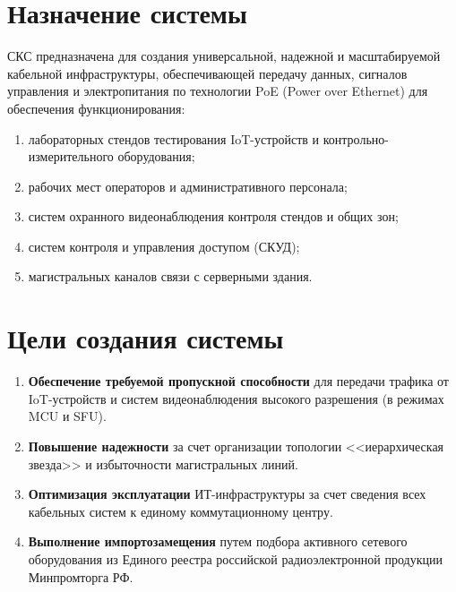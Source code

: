 \documentclass[a4paper,oneside,14pt]{extreport}
\begin{document}
\begin{appendices}

\section{Назначение системы}
СКС предназначена для создания универсальной, надежной и масштабируемой кабельной инфраструктуры, обеспечивающей передачу данных, сигналов управления и электропитания по технологии PoE (Power over Ethernet) для обеспечения функционирования:
\begin{enumerate}[label=\asbuk*)]
    \item лабораторных стендов тестирования IoT-устройств и контрольно-измерительного оборудования;
    \item рабочих мест операторов и административного персонала;
    \item систем охранного видеонаблюдения контроля стендов и общих зон;
    \item систем контроля и управления доступом (СКУД);
    \item магистральных каналов связи с серверными здания.
\end{enumerate}

\section{Цели создания системы}
\begin{enumerate}[label=\arabic{section}.\arabic*]
    \item \textbf{Обеспечение требуемой пропускной способности} для передачи трафика от IoT-устройств и систем видеонаблюдения высокого разрешения (в режимах MCU и SFU).
    \item \textbf{Повышение надежности} за счет организации топологии <<иерархическая звезда>> и избыточности магистральных линий.
    \item \textbf{Оптимизация эксплуатации} ИТ-инфраструктуры за счет сведения всех кабельных систем к единому коммутационному центру.
    \item \textbf{Выполнение импортозамещения} путем подбора активного сетевого оборудования из Единого реестра российской радиоэлектронной продукции Минпромторга РФ.
\end{enumerate}



\end{appendices}
\end{document}
